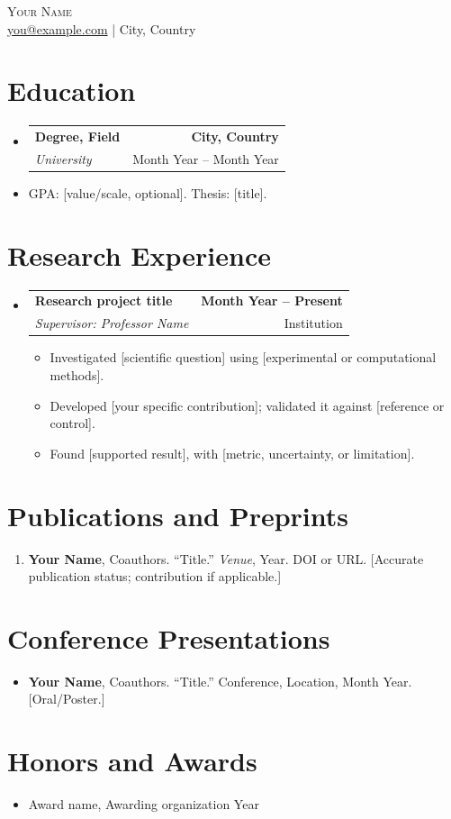 \documentclass[letterpaper,11pt]{article}
\makeatletter
\newcommand{\resumeItem}[1]{\item{#1 \vspace{-2pt}}}
\newcommand{\resumeSubheading}[4]{
  \vspace{-2pt}\item
    \begin{tabular*}{1.0\textwidth}[t]{l@{\extracolsep{\fill}}r}
      \textbf{#1} & \textbf{\small #2} \\
      \textit{\small#3}{}& \small #4 \\
    \end{tabular*}\vspace{-7pt}
}
\newcommand{\resumeSubHeadingListStart}{\begin{itemize}[leftmargin=0.0in, label={}]}
\newcommand{\resumeSubHeadingListEnd}{\end{itemize}}
\newcommand{\resumeItemListStart}{\begin{itemize}}
\newcommand{\resumeItemListEnd}{\end{itemize}\vspace{-5pt}}
\makeatother
\begin{document}
\thispagestyle{firstpage}
\begin{center}
{\Huge\scshape Your Name}\\[4pt]
\href{mailto:you@example.com}{you@example.com} \quad | \quad City, Country
\end{center}
\section{Education}
\resumeSubHeadingListStart
\resumeSubheading{Degree, Field}{City, Country}{University}{Month Year -- Month Year}
\item GPA: [value/scale, optional]. Thesis: [title].
\resumeSubHeadingListEnd
\section{Research Experience}
\resumeSubHeadingListStart
\resumeSubheading{Research project title}{Month Year -- Present}{Supervisor: Professor Name}{Institution}
\resumeItemListStart
\resumeItem{Investigated [scientific question] using [experimental or computational methods].}
\resumeItem{Developed [your specific contribution]; validated it against [reference or control].}
\resumeItem{Found [supported result], with [metric, uncertainty, or limitation].}
\resumeItemListEnd
\resumeSubHeadingListEnd
\section{Publications and Preprints}
\begin{enumerate}[leftmargin=*]
\item \textbf{Your Name}, Coauthors. ``Title.'' \textit{Venue}, Year. DOI or URL. [Accurate publication status; contribution if applicable.]
\end{enumerate}
\section{Conference Presentations}
\begin{itemize}[leftmargin=*]
\item \textbf{Your Name}, Coauthors. ``Title.'' Conference, Location, Month Year. [Oral/Poster.]
\end{itemize}
\section{Honors and Awards}
\begin{itemize}[leftmargin=*]
\item Award name, Awarding organization \hfill Year
\end{itemize}
\end{document}
